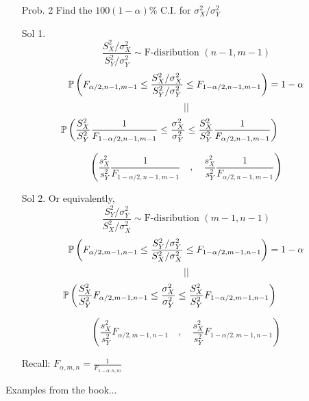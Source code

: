 \begin{frame}
	\begin{enumerate}
\item[Prob. 2] Find the $100(1-\alpha)\%$ C.I. for $\sigma_X^2/\sigma_Y^2$
	\vfill
\item[Sol 1.]
	\[
		\frac{S_X^2/\sigma_X^2}{S_Y^2/\sigma_Y^2} \sim \text{F-disribution $(n-1,m-1)$}
	\]
		\[
		\mathbb{P} \left(F_{\alpha/2,n-1,m-1} \le\frac{S_X^2/\sigma_X^2}{S_Y^2/\sigma_Y^2}
	\le F_{1-\alpha/2,n-1,m-1}\right) =1-\alpha
	\]
	\[||\]
	\[
		\hspace{-3.5em}	\bbP \left(
			\frac{S_X^2}{S_Y^2}  \frac{1}{F_{1-\alpha/2,n-1,m-1}}
			\le
\frac{\sigma_X^2}{\sigma_Y^2}
\le
			\frac{S_X^2}{S_Y^2}  \frac{1}{F_{\alpha/2,n-1,m-1}}
		\right )
	\]
\item[]
	\vfill
	\[
		\left(
			\frac{s_X^2}{s_Y^2}  \frac{1}{F_{1-\alpha/2,n-1,m-1}}
			\quad,\quad
			\frac{s_X^2}{s_Y^2}  \frac{1}{F_{\alpha/2,n-1,m-1}}
		 \right )
	\]
\myEnd
	\end{enumerate}
\end{frame}
\begin{frame}

	\begin{enumerate}
		\item[Sol 2.] Or equivalently,
	\[
		\frac{S_Y^2/\sigma_Y^2}{S_X^2/\sigma_X^2} \sim \text{F-disribution $(m-1,n-1)$}
	\]
		\[
		\mathbb{P} \left(F_{\alpha/2,m-1,n-1} \le\frac{S_Y^2/\sigma_Y^2}{S_X^2/\sigma_X^2}
	\le F_{1-\alpha/2,m-1,n-1}\right) =1-\alpha
	\]
	\[||\]
	\[
		\hspace{-3.5em}	\bbP \left(
			\frac{S_X^2}{S_Y^2}  F_{\alpha/2,m-1,n-1}
			\le
\frac{\sigma_X^2}{\sigma_Y^2}
\le
			\frac{S_X^2}{S_Y^2}  F_{1-\alpha/2,m-1,n-1}
		\right )
	\]
	\vfill
\item[]
	\[
		\left(
			\frac{s_X^2}{s_Y^2}  {F_{\alpha/2,m-1,n-1}}
			\quad,\quad
			\frac{s_X^2}{s_Y^2}  {F_{1-\alpha/2,m-1,n-1}}
		 \right )
	\]
\myEnd
\vfill
\item[Recall:]\hspace{3em} $\displaystyle F_{\alpha,m,n} = \frac{1}{F_{1-\alpha, n,m}}$
	\end{enumerate}
\end{frame}
\begin{frame}
\centering
	Examples from the book...
\end{frame}
